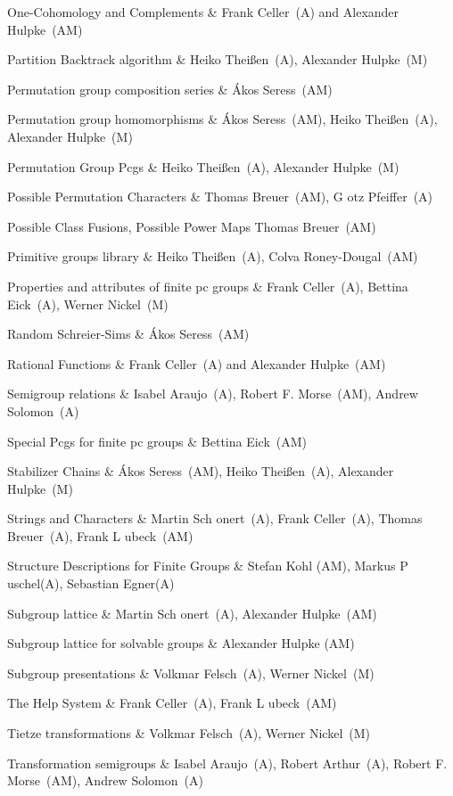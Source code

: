 One-Cohomology and Complements &
Frank Celler~(A) and Alexander Hulpke~(AM)

Partition Backtrack algorithm &
Heiko Thei{\ss}en~(A), Alexander Hulpke~(M)

Permutation group composition series &
{\'A}kos Seress~(AM)

Permutation group homomorphisms &
{\'A}kos Seress~(AM), Heiko Thei{\ss}en~(A), Alexander Hulpke~(M)

Permutation Group Pcgs &
Heiko Thei{\ss}en~(A), Alexander Hulpke~(M)

Possible Permutation Characters &
Thomas Breuer~(AM), G{ o}tz Pfeiffer~(A)

Possible Class Fusions, Possible Power Maps
Thomas Breuer~(AM)

Primitive groups library &
Heiko Thei{\ss}en~(A), Colva Roney-Dougal~(AM)

Properties and attributes of finite pc groups &
Frank Celler~(A), Bettina Eick~(A), Werner Nickel~(M)

Random Schreier-Sims &
{\'A}kos Seress~(AM)

Rational Functions &
Frank Celler~(A) and Alexander Hulpke~(AM)

Semigroup relations &
Isabel Araujo~(A), Robert F. Morse~(AM), Andrew Solomon~(A)

Special Pcgs for finite pc groups &
Bettina Eick~(AM)

Stabilizer Chains &
{\'A}kos Seress~(AM), Heiko Thei{\ss}en~(A), Alexander Hulpke~(M)

Strings and Characters & 
Martin Sch{ o}nert~(A), Frank Celler~(A), Thomas Breuer~(A), 
Frank L{ u}beck~(AM)

Structure Descriptions for Finite Groups &
Stefan Kohl (AM), Markus P{ u}schel(A), Sebastian Egner(A)

Subgroup lattice &
Martin Sch{ o}nert~(A), Alexander Hulpke~(AM)

Subgroup lattice for solvable groups &
Alexander Hulpke (AM)

Subgroup presentations &
Volkmar Felsch~(A), Werner Nickel~(M)

The Help System &
Frank Celler~(A), Frank L{ u}beck~(AM)

Tietze transformations &
Volkmar Felsch~(A), Werner Nickel~(M)

Transformation semigroups &
Isabel Araujo~(A), Robert Arthur~(A), Robert F. Morse~(AM), 
Andrew Solomon~(A)

